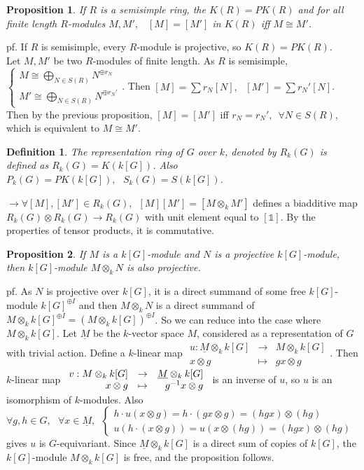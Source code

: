 \documentclass[12pt,letterpaper]{report}
\newtheorem{definition}{Definition}[section]
\newtheorem{proposition}{Proposition}[section]
\begin{document}
\begin{proposition}If $R$ is a semisimple ring, the $K(R)=PK(R)$ and for all finite length $R$-modules $M,M',\,\,\,\,\,[M]=[M']$ in $K(R)$ iff $M\cong M'$.\end{proposition}
pf. If $R$ is semisimple, every $R$-module is projective, so $K(R)=PK(R)$.
\\Let $M,M'$ be two $R$-modules of finite length. As $R$ is semisimple, $\left\{\begin{array}{r}M\cong\bigoplus_{N\in S(R)}N^{\oplus r_{N}}\\M'\cong\bigoplus_{N\in S(R)}N^{\oplus r_{N}'}\end{array}\right.$. Then $[M]=\sum r_{N}[N],\,\,\,\,[M']=\sum r_{N}'[N]$. Then by the previous proposition, $[M]=[M']$ iff $r_{N}=r_{N}',\,\,\,\forall N\in S(R)$, which is equivalent to $M\cong M'$.
\begin{definition}The representation ring of $G$ over $k$, denoted by $R_{k}(G)$ is defined as $R_{k}(G)=K(k[G])$. Also $P_{k}(G)=PK(k[G]),\,\,\,\,S_{k}(G)=S(k[G])$.\end{definition}
$\rightarrow \forall [M],[M']\in R_{k}(G),\,\,\,[M][M']=[M\otimes_{k}M']$ defines a biadditive map $R_{k}(G)\otimes R_{k}(G)\rightarrow R_{k}(G)$ with unit element equal to $[\mathbb{1}]$. By the properties of tensor products, it is commutative. 
\begin{proposition}If $M$ is a $k[G]$-module and $N$ is a projective $k[G]$-module, then $k[G]$-module $M\otimes_{k}N$ is also projective.\end{proposition}
pf. As $N$ is projective over $k[G]$, it is a direct summand of some free $k[G]$-module $k[G]^{\oplus I}$ and then $M\otimes_{k}N$ is a direct summand of $M\otimes_{k}k[G]^{\oplus I}=(M\otimes_{k}k[G])^{\oplus I}$. So we can reduce into the case where $M\otimes_{k}k[G]$. Let $\underline{M}$ be the $k$-vector space $M$, considered as a representation of $G$ with trivial action. Define a $k$-linear map $\begin{array}{rrr}u:\underline{M}\otimes_{k}k[G]&\rightarrow&M\otimes_{k}k[G]\\x\otimes g&\mapsto&gx\otimes g\end{array}$. Then $k$-linear map $\\\begin{array}{rrr}v:M\otimes_{k}k[G]&\rightarrow&\underline{M}\otimes_{k}k[G]\\x\otimes g&\mapsto&g^{-1}x\otimes g\end{array}$ is an inverse of $u$, so $u$ is an isomorphism of $k$-modules. Also $\forall g,h\in G,\,\,\,\,\forall x\in \underline{M},\,\,\,\left\{\begin{array}{r}h\cdot u(x\otimes g)=h\cdot(gx\otimes g)=(hgx)\otimes(hg)\\u(h\cdot(x\otimes g))=u(x\otimes (hg))=(hgx)\otimes (hg)\end{array}\right.$ gives $u$ is $G$-equivariant. Since $\underline{M}\otimes_{k}k[G]$ is a direct sum of copies of $k[G]$, the $k[G]$-module $M\otimes_{k}k[G]$ is free, and the proposition follows. 
\end{document}
